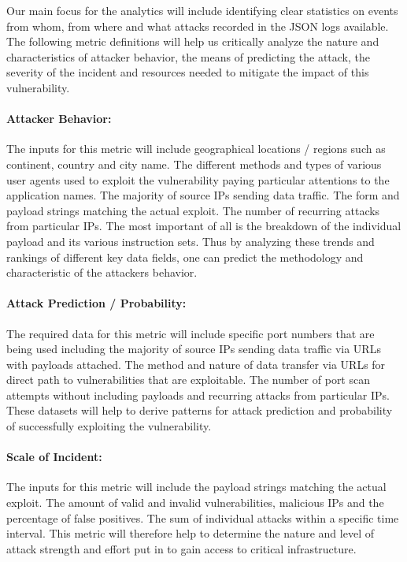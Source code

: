 Our main focus for the analytics will include identifying clear statistics on events from whom, from where and what attacks recorded in the JSON logs available. The following metric definitions will help us critically analyze the nature and characteristics of attacker behavior, the means of predicting the attack, the severity of the incident and resources needed to mitigate the impact of this vulnerability.    
\indent
\paragraph{Attacker Behavior:}
The inputs for this metric will include geographical locations / regions such as continent, country and city name. The different methods and types of various user agents used to exploit the vulnerability paying particular attentions to the application names. The majority of source IPs sending data traffic. The form and payload strings matching the actual exploit. The number of recurring attacks from particular IPs. The most important of all is the breakdown of the individual payload and its various instruction sets. Thus by analyzing these trends and rankings of different key data fields, one can predict the methodology and characteristic of the attackers behavior. 
\indent
\paragraph{Attack Prediction / Probability:}
The required data for this metric will include specific port numbers that are being used including the majority of source IPs sending data traffic via URLs with payloads attached. The method and nature of data transfer via URLs for direct path to vulnerabilities that are exploitable. The number of port scan attempts without including payloads and recurring attacks from particular IPs. These datasets will help to derive patterns for attack prediction and probability of successfully exploiting the vulnerability. 
\indent
\paragraph{Scale of Incident:}
The inputs for this metric will include the payload strings matching the actual exploit. The amount of valid and invalid vulnerabilities, malicious IPs and the percentage of false positives. The sum of individual attacks within a specific time interval. This metric will therefore help to determine the nature and level of attack strength and effort put in to gain access to critical infrastructure.
